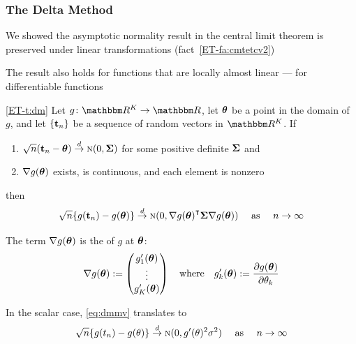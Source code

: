 \begin{frame}\frametitle{The Delta Method}

    \vspace{2em}
    We showed the asymptotic normality result in the central limit theorem is preserved
    under linear transformations (fact~\ref{ET-fa:cmtetcv2})
    
    The result also holds for functions that are locally
    almost linear --- for differentiable functions
    
    \vspace{1em}
    \Thm\eqref{ET-t:dm}
    Let $g \colon \RR^K \to \RR$, let ${\boldsymbol \theta}$ be a point in the domain
    of $g$, and let $\{{\mathbf t}_n\}$ be a sequence of
    random vectors in $\RR^K$. If
    \begin{enumerate}
        \item $\sqrt{n} ({\mathbf t}_n - {\boldsymbol \theta}) \stackrel { d } {\to} \textrm{\sc n}(0, {\boldsymbol \Sigma})$ for
            some positive definite ${\boldsymbol \Sigma}$ and
        \item $\nabla g({\boldsymbol \theta})$ exists, is continuous, and each element is nonzero
    \end{enumerate}
    then
    \begin{equation}
        \label{eq:dmmv}
        \sqrt{n} \{ g(\boldt_n) - g(\boldtheta) \}
        \tod \nN(0, \nabla g(\boldtheta)^\T \boldSigma \nabla g(\boldtheta))
         \quad \text{ as } \quad
         n \to \infty
    \end{equation}
    
\end{frame}



\begin{frame}

    \vspace{2em}
    The term $\nabla g({\boldsymbol \theta})$ is the 
    of $g$ at ${\boldsymbol \theta}$:
    \begin{equation*}
        \nabla g({\boldsymbol \theta})
        := 
        \begin{pmatrix}
             g'_1({\boldsymbol \theta})
             \\
             \vdots
             \\
             g'_K({\boldsymbol \theta})
        \end{pmatrix}
        \quad \text{where} \quad
        g'_k ({\boldsymbol \theta}) := \frac{\partial g({\boldsymbol \theta})} {\partial \theta_k}
    \end{equation*}
    
    \vspace{1em}
    In the scalar case, \eqref{eq:dmmv} translates to     
    \begin{equation*}
        \label{eq:dm0}
        \sqrt{n} \{ g(t_n) - g(\theta) \}
        \stackrel { d } {\to} \textrm{\sc n}(0, g'(\theta)^2 \sigma^2)
         \quad \text{ as } \quad
         n \to \infty
    \end{equation*}
    
\end{frame}


